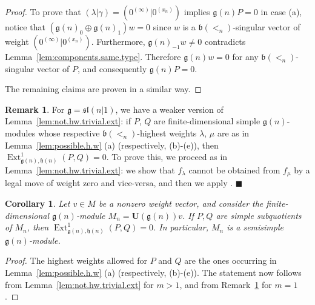 \documentclass[12pt]{amsart}
\newcommand\g{\mathfrak{g}}
\newcommand\fh{\mathfrak{h}}
\newcommand\fb{\mathfrak{b}}
\newcommand\fsl{\mathfrak{sl}}
\newcommand\bU{\mathbf{U}}
\DeclareMathOperator{\Ext}{Ext}
\theoremstyle{plain}
\newtheorem{cor}[theo]{Corollary}
\theoremstyle{definition}
\newtheorem{rem}[theo]{Remark}
\numberwithin{equation}{section}
\newcommand\xqed[1]{%
  \leavevmode\unskip\penalty9999 \hbox{}\nobreak\hfill
  \quad\hbox{#1}}
\newcommand\demo{\xqed{$\blacksquare$}}
\begin{document}
\begin{proof}
To prove that $(\lambda | \gamma) = (0^{(\infty)}| 0^{(x_n)})$ implies $\g(n)P=0$ in case (a), notice that $(\g(n)_0\oplus \g(n)_{ 1}) w=0$ since  $w$ is a $\fb(<_n)$-singular  vector of weight $(0^{(\infty)}| 0^{(x_n)})$. Furthermore, $\g(n)_{-1}w\neq 0$ contradicts Lemma~\ref{lem:components.same.type}. Therefore $\g(n)w=0$ for any $\fb(<_n)$-singular vector of $P$, and consequently $\g(n)P=0$.

The remaining claims are proven in a similar way.
\end{proof}

\begin{rem}\label{rem:not.hw.trivial.ext.n=1}
For $\g = \fsl(n | 1)$, we have a weaker version of Lemma~\ref{lem:not.hw.trivial.ext}: if $P$, $Q$ are finite-dimensional simple $\g(n)$-modules whose respective $\fb(<_n)$-highest weights $\lambda$, $\mu$ are as in Lemma~\ref{lem:possible.h.w} (a) (respectively, (b)-(e)), then $\Ext_{\g(n), \fh(n)}^1 (P, Q)=0$. To prove this, we proceed as in Lemma~\ref{lem:not.hw.trivial.ext}: we show that $f_\lambda$ cannot be obtained from $f_\mu$ by a legal move of weight zero and vice-versa, and then we apply \cite{MS11}. \demo
\end{rem}

\begin{cor}\label{cor:M_n.semisimple}
Let $v\in M$ be a nonzero weight vector, and consider the finite-dimensional $\g(n)$-module $M_n = \bU(\g(n)) v$. If $P, Q$ are simple subquotients of $M_n$, then $\Ext_{\g(n), \fh(n)}^1 (P,Q)=0$. In particular, $M_n$ is a semisimple $\g(n)$-module.
\end{cor}
\begin{proof}
The highest weights allowed for $P$ and $Q$ are the ones occurring in Lemma~\ref{lem:possible.h.w} (a) (respectively, (b)-(e)). The statement now follows from Lemma~\ref{lem:not.hw.trivial.ext} for $m>1$, and from Remark~\ref{rem:not.hw.trivial.ext.n=1} for $m=1$.
\end{proof}
\end{document}
